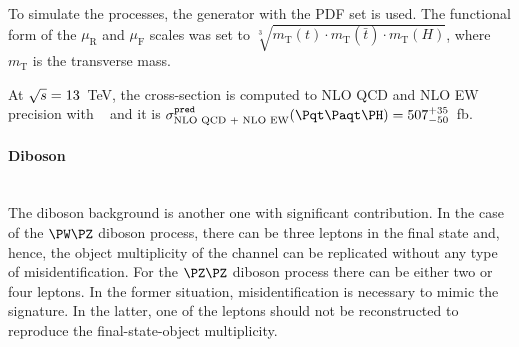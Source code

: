 To simulate the \ttH processes, the \POWHEGBOX[v2] generator with the \NNPDF[3.0nlo] PDF set
is used. The functional form of the $\mu_{\text{R}}$ and $\mu_{\text{F}}$ scales was
set to \(\sqrt[3]{m_\text{T}(t)\cdot m_\text{T}(\bar{t}) \cdot m_\text{T}(H)}\), 
where $m_\text{T}$ is the transverse mass.
 
At $\sqrt{s}=13$~TeV, the cross-section is computed to NLO QCD and 
NLO EW precision with \MGNLO~\cite{LHCHiggsCrossSectionWorkingGroup:2016ypw} and it
is \mbox{$\sigma_{\text{NLO QCD + NLO EW}}^{\texttt{pred}} (\ttH) = 507^{+35}_{-50}$~fb.}
 
\paragraph{Diboson}\mbox{}\\
The diboson background is another one with significant contribution. %
In the case of the $\PW\PZ$ diboson process, there %
can be  three leptons in the final state and, hence, the object multiplicity
of the \dileptau channel can be replicated without any type of misidentification.
For the $\PZ\PZ$ diboson process there %
can be either two or four leptons. In the former situation, misidentification is necessary to mimic the \dileptau signature.
In the latter, one of the leptons should not be reconstructed to reproduce the \dileptau final-state-object multiplicity.



